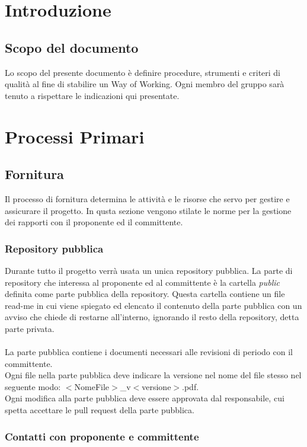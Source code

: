 \documentclass[a4paper, 12pt]{article}
\begin{document}
\makefrontpage

\makeversioni

\tableofcontents
\pagebreak

\section{Introduzione}
\subsection{Scopo del documento}
Lo scopo del presente documento è definire procedure, strumenti e criteri di qualità al fine di stabilire un Way of Working. Ogni membro del gruppo sarà tenuto a rispettare le indicazioni qui presentate.


\section{Processi Primari}
\subsection{Fornitura}\label{fornitura}
Il processo di fornitura determina le attività e le risorse che servo per gestire e assicurare il progetto. In qusta sezione vengono stilate le norme per la gestione dei rapporti con il proponente ed il committente.
\subsubsection{Repository pubblica}
Durante tutto il progetto verrà usata un unica repository pubblica. La parte di repository che interessa al proponente ed al committente è la cartella \textit{public} definita come parte pubblica della repository. Questa cartella contiene un file read-me in cui viene spiegato ed elencato il contenuto della parte pubblica con un avviso che chiede di restarne all'interno, ignorando il resto della repository, detta parte privata.\\\\
La parte pubblica contiene i documenti necessari alle revisioni di periodo con il committente.\\
Ogni file nella parte pubblica deve indicare la versione nel nome del file stesso nel seguente modo: $<$NomeFile$>$\_v$<$versione$>$.pdf.\\
Ogni modifica alla parte pubblica deve essere approvata dal responsabile, cui spetta accettare le pull request della parte pubblica.
\subsubsection{Contatti con proponente e committente}
\end{document}
